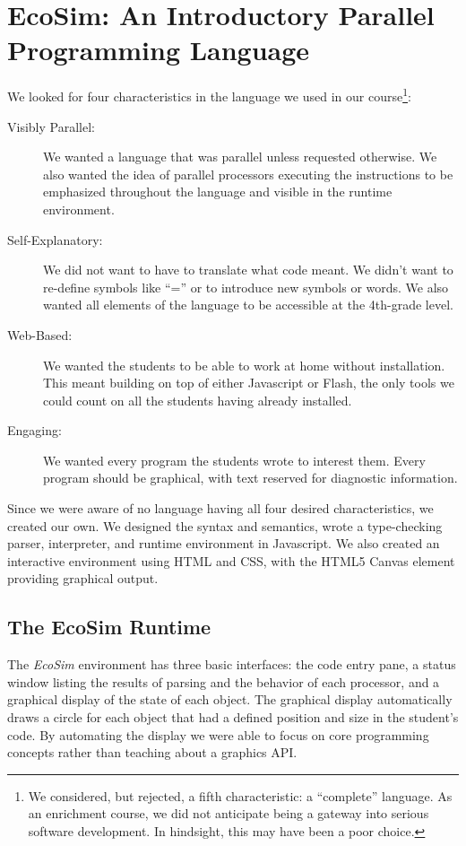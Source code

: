\documentclass{sig-alternate}
\newcommand{\EcoSim}{\emph{EcoSim}}
\begin{document}
\section{EcoSim: An Introductory Parallel Programming Language}
We looked for four characteristics in the language we used in our course\footnote{
We considered, but rejected, a fifth characteristic: a ``complete'' language.
As an enrichment course, we did not anticipate being a gateway into serious software development.
In hindsight, this may have been a poor choice.
}:
\begin{description}
	\item[Visibly Parallel:]
		We wanted a language that was parallel unless requested otherwise.
		We also wanted the idea of parallel processors executing the instructions
		to be emphasized throughout the language and visible in the runtime environment.
	\item[Self-Explanatory:]
		We did not want to have to translate what code meant.
		We didn't want to re-define symbols like ``='' or to introduce new symbols or words.
		We also wanted all elements of the language to be accessible at the 4th-grade level.
	\item[Web-Based:]
		We wanted the students to be able to work at home without installation.
		This meant building on top of either Javascript or Flash, 
		the only tools we could count on all the students having already installed.
	\item[Engaging:]
		We wanted every program the students wrote to interest them.
		Every program should be graphical, with text reserved for diagnostic information.
\end{description}

Since we were aware of no language having all four desired characteristics, 
we created our own.
We designed the syntax and semantics, 
wrote a type-checking parser, interpreter, and runtime environment in Javascript.
We also created an interactive environment using HTML and CSS, with the HTML5 Canvas element providing graphical output.

\subsection{The EcoSim Runtime}\label{sec:runtime}
The \EcoSim{} environment has three basic interfaces:
the code entry pane, 
a status window listing the results of parsing and the behavior of each processor,
and a graphical display of the state of each object.
The graphical display automatically draws a circle for each object
that had a defined position and size in the student's code.
By automating the display 
we were able to focus on core programming concepts
rather than teaching about a graphics API.
\end{document}

